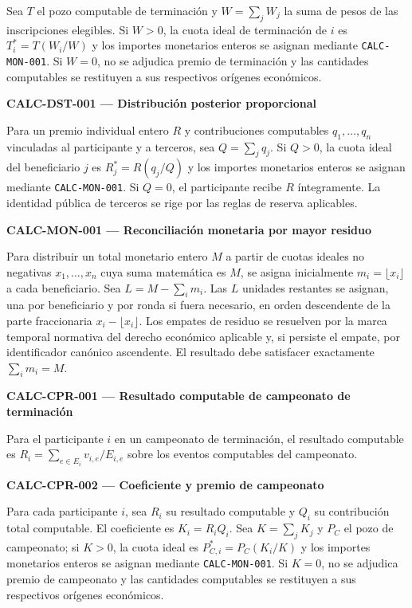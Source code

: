 \documentclass[10pt,letterpaper]{article}
\begin{document}
Sea $T$ el pozo computable de terminación y $W=\sum_j W_j$ la suma de pesos de las inscripciones elegibles. Si $W>0$, la cuota ideal de terminación de $i$ es $T_i^*=T(W_i/W)$ y los importes monetarios enteros se asignan mediante \texttt{CALC-MON-001}. Si $W=0$, no se adjudica premio de terminación y las cantidades computables se restituyen a sus respectivos orígenes económicos.\par\vspace{0.5em}
\noindent\textbf{CALC-DST-001 --- Distribución posterior proporcional}\par
Para un premio individual entero $R$ y contribuciones computables $q_1,\ldots,q_n$ vinculadas al participante y a terceros, sea $Q=\sum_j q_j$. Si $Q>0$, la cuota ideal del beneficiario $j$ es $R_j^*=R(q_j/Q)$ y los importes monetarios enteros se asignan mediante \texttt{CALC-MON-001}. Si $Q=0$, el participante recibe $R$ íntegramente. La identidad pública de terceros se rige por las reglas de reserva aplicables.\par\vspace{0.5em}
\noindent\textbf{CALC-MON-001 --- Reconciliación monetaria por mayor residuo}\par
Para distribuir un total monetario entero $M$ a partir de cuotas ideales no negativas $x_1,\ldots,x_n$ cuya suma matemática es $M$, se asigna inicialmente $m_i=\lfloor x_i\rfloor$ a cada beneficiario. Sea $L=M-\sum_i m_i$. Las $L$ unidades restantes se asignan, una por beneficiario y por ronda si fuera necesario, en orden descendente de la parte fraccionaria $x_i-\lfloor x_i\rfloor$. Los empates de residuo se resuelven por la marca temporal normativa del derecho económico aplicable y, si persiste el empate, por identificador canónico ascendente. El resultado debe satisfacer exactamente $\sum_i m_i=M$.\par\vspace{0.5em}
\noindent\textbf{CALC-CPR-001 --- Resultado computable de campeonato de terminación}\par
Para el participante $i$ en un campeonato de terminación, el resultado computable es $R_i=\sum_{e\in E_i} v_{i,e}/E_{i,e}$ sobre los eventos computables del campeonato.\par\vspace{0.5em}
\noindent\textbf{CALC-CPR-002 --- Coeficiente y premio de campeonato}\par
Para cada participante $i$, sea $R_i$ su resultado computable y $Q_i$ su contribución total computable. El coeficiente es $K_i=R_iQ_i$. Sea $K=\sum_jK_j$ y $P_C$ el pozo de campeonato; si $K>0$, la cuota ideal es $P_{C,i}^*=P_C(K_i/K)$ y los importes monetarios enteros se asignan mediante \texttt{CALC-MON-001}. Si $K=0$, no se adjudica premio de campeonato y las cantidades computables se restituyen a sus respectivos orígenes económicos.\par\vspace{0.5em}
\end{document}

